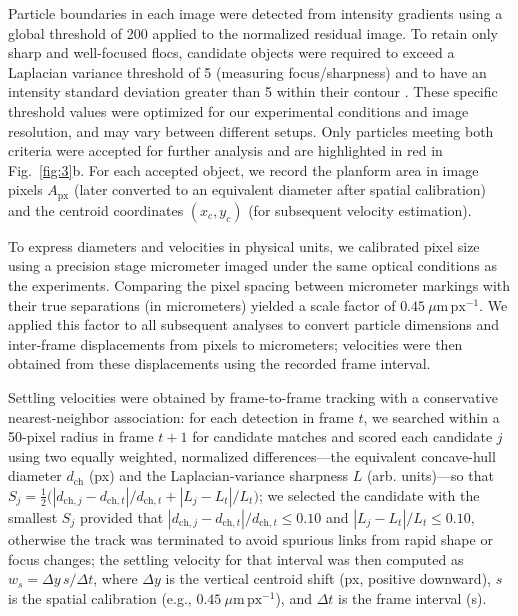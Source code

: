 \documentclass{agujournal2019}
\begin{document}
Particle boundaries in each image were detected from intensity gradients using a global threshold of 200 applied to the normalized residual image. To retain only sharp and well-focused flocs, candidate objects were required to exceed a Laplacian variance threshold of 5 (measuring focus/sharpness) and to have an intensity standard deviation greater than 5 within their contour \cite{pertuz2013analysis}. These specific threshold values were optimized for our experimental conditions and image resolution, and may vary between different setups. Only particles meeting both criteria were accepted for further analysis and are highlighted in red in Fig.~\ref{fig:3}b. For each accepted object, we record the planform area in image pixels $A_{\mathrm{px}}$ (later converted to an equivalent diameter after spatial calibration) and the centroid coordinates $(x_c,y_c)$ (for subsequent velocity estimation).

To express diameters and velocities in physical units, we calibrated pixel size using a precision stage micrometer imaged under the same optical conditions as the experiments. Comparing the pixel spacing between micrometer markings with their true separations (in micrometers) yielded a scale factor of \(0.45~\mu\mathrm{m\,px^{-1}}\). We applied this factor to all subsequent analyses to convert particle dimensions and inter-frame displacements from pixels to micrometers; velocities were then obtained from these displacements using the recorded frame interval.

Settling velocities were obtained by frame-to-frame tracking with a conservative nearest-neighbor association: for each detection in frame \(t\), we searched within a 50-pixel radius in frame \(t{+}1\) for candidate matches and scored each candidate \(j\) using two equally weighted, normalized differences—the equivalent concave-hull diameter \(d_{\mathrm{ch}}\) (px) and the Laplacian-variance sharpness \(L\) (arb. units)—so that \(S_j=\tfrac12\big(|d_{\mathrm{ch},j}-d_{\mathrm{ch},t}|/d_{\mathrm{ch},t}+|L_j-L_t|/L_t\big)\); we selected the candidate with the smallest \(S_j\) provided that \(|d_{\mathrm{ch},j}-d_{\mathrm{ch},t}|/d_{\mathrm{ch},t}\le 0.10\) and \(|L_j-L_t|/L_t\le 0.10\), otherwise the track was terminated to avoid spurious links from rapid shape or focus changes; the settling velocity for that interval was then computed as \(w_s=\Delta y\,s/\Delta t\), where \(\Delta y\) is the vertical centroid shift (px, positive downward), \(s\) is the spatial calibration (e.g., \(0.45~\mu\mathrm{m\,px^{-1}}\)), and \(\Delta t\) is the frame interval (s).
\end{document}
